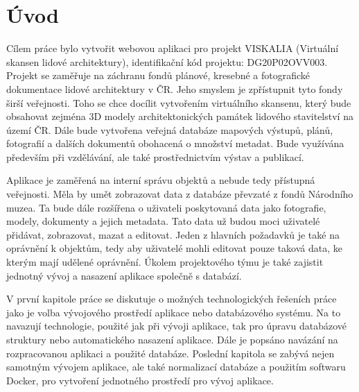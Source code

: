 \chapter*{Úvod}
\label{0-uvod}


Cílem práce bylo vytvořit webovou aplikaci pro projekt VISKALIA
(Virtuální skansen lidové architektury), identifikační kód projektu:
DG20P02OVV003. Projekt se zaměřuje na záchranu fondů plánové, kresebné
a fotografické dokumentace lidové architektury v ČR. Jeho smyslem je
zpřístupnit tyto fondy širší veřejnosti. Toho se chce docílit
vytvořením virtuálního skansenu, který bude obsahovat zejména 3D
modely architektonických památek lidového stavitelství na území
ČR. Dále bude vytvořena veřejná databáze mapových výstupů, plánů,
fotografií a dalších dokumentů obohacená o množství metadat. Bude
využívána především při vzdělávání, ale také prostřednictvím výstav a
publikací.

Aplikace je zaměřená na interní správu objektů a nebude tedy přístupná
veřejnosti. Měla by umět zobrazovat data z databáze převzaté
z fondů Národního muzea. Ta bude dále rozšířena o uživateli poskytovaná
data jako fotografie, modely, dokumenty a jejich metadata. Tato data
už budou moci uživatelé přidávat, zobrazovat, mazat a editovat. Jeden
z hlavních požadavků je také na oprávnění k objektům, tedy aby
uživatelé mohli editovat pouze taková data, ke kterým mají udělené
oprávnění. Úkolem projektového týmu je také zajistit jednotný vývoj a nasazení 
aplikace společně s databází.

V první kapitole práce se diskutuje o možných technologických řešeních práce jako 
je volba vývojového prostředí aplikace nebo databázového systému. Na to navazují 
technologie, použité jak při vývoji aplikace, tak pro úpravu databázové struktury nebo 
automatického nasazení aplikace. Dále je popsáno navázání na rozpracovanou aplikaci a
použité databáze. Poslední kapitola se zabývá nejen samotným vývojem aplikace, ale také 
normalizací databáze a použitím softwaru Docker, pro vytvoření jednotného prostředí pro 
vývoj aplikace.



